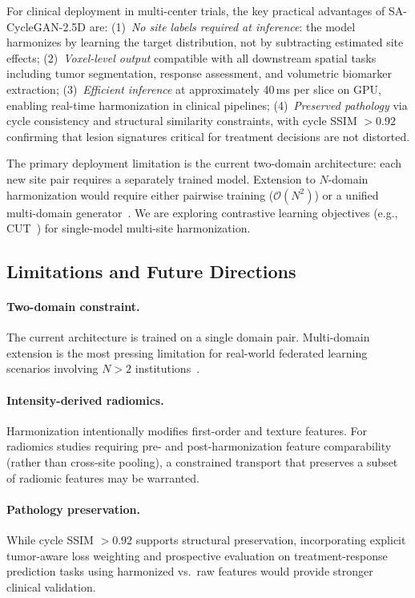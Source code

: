 \documentclass{article}
\begin{document}
For clinical deployment in multi-center trials, the key practical advantages of
SA-CycleGAN-2.5D are: (1)~\emph{No site labels required at inference}: the model
harmonizes by learning the target distribution, not by subtracting estimated site effects;
(2)~\emph{Voxel-level output} compatible with all downstream spatial tasks including
tumor segmentation, response assessment, and volumetric biomarker extraction;
(3)~\emph{Efficient inference} at approximately 40\,ms per slice on GPU, enabling
real-time harmonization in clinical pipelines; (4)~\emph{Preserved pathology} via
cycle consistency and structural similarity constraints, with cycle SSIM $> 0.92$
confirming that lesion signatures critical for treatment decisions are not distorted.

The primary deployment limitation is the current two-domain architecture: each new site
pair requires a separately trained model. Extension to $N$-domain harmonization would
require either pairwise training ($\mathcal{O}(N^2)$) or a unified multi-domain
generator~\cite{choi2018stargan}. We are exploring contrastive learning objectives
(e.g., CUT~\cite{park2020cut}) for single-model multi-site harmonization.

\subsection{Limitations and Future Directions}

\paragraph{Two-domain constraint.}
The current architecture is trained on a single domain pair. Multi-domain extension is
the most pressing limitation for real-world federated learning scenarios involving
$N > 2$ institutions~\cite{choi2018stargan}.

\paragraph{Intensity-derived radiomics.}
Harmonization intentionally modifies first-order and texture features. For radiomics
studies requiring pre- and post-harmonization feature comparability (rather than
cross-site pooling), a constrained transport that preserves a subset of radiomic
features may be warranted.

\paragraph{Pathology preservation.}
While cycle SSIM $> 0.92$ supports structural preservation, incorporating explicit
tumor-aware loss weighting and prospective evaluation on treatment-response prediction
tasks using harmonized vs.\ raw features would provide stronger clinical validation.
\end{document}
